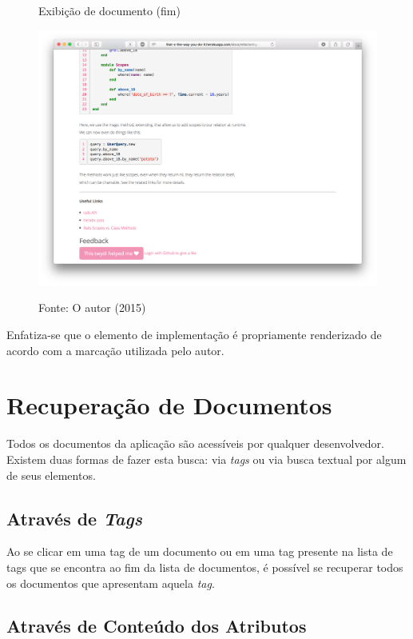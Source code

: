 \begin{figure}[hb]
	\centering
    \caption{Exibição de documento (fim)}
    \includegraphics[width=13cm]{Imagens/print-show-3.png}
    \label{fig:doc-show-3}
	\caption*{Fonte: O autor (2015)}
\end{figure}

\clearpage

Enfatiza-se que o elemento de implementação é propriamente renderizado de acordo com a marcação utilizada pelo autor.

\section{Recuperação de Documentos}

Todos os documentos da aplicação são acessíveis por qualquer desenvolvedor. Existem duas formas de fazer esta busca: via \textit{tags} ou via busca textual por algum de seus elementos.

\subsection{Através de \textit{Tags}}

Ao se clicar em uma tag de um documento ou em uma tag presente na lista de tags que se encontra ao fim da lista de documentos, é possível se recuperar todos os documentos que apresentam aquela \textit{tag}.

\subsection{Através de Conteúdo dos Atributos}

